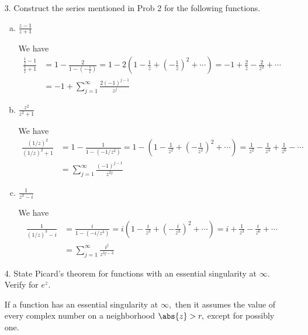 \documentclass{article}
\begin{document}
\begin{itemize}
\begin{enumerate}[(a)]
		\end{enumerate}

	\item[3.] Construct the series mentioned in Prob 2 for the following functions.
		\begin{enumerate}[(a)]
			\item $\frac{z-1}{z+1}$
				\begin{soln}
					We have
					\begin{align*}
						\frac{\frac{1}{z}-1}{\frac{1}{z}+1} &= 1-\frac{2}{1-\left( -\frac{1}{z} \right)} = 1 - 2\left( 1 - \frac{1}{z} + \left( -\frac{1}{z} \right)^2 + \cdots \right) = -1 + \frac{2}{z} - \frac{2}{z^2} + \cdots \\
						&= -1 + \sum_{j=1}^{\infty} \frac{2(-1)^{j-1}}{z^j}
					\end{align*}
				\end{soln}

			\item $\frac{z^2}{z^2+1}$
				\begin{soln}
					We have
					\begin{align*}
						\frac{(1/z)^2}{(1/z)^2+1} &= 1-\frac{1}{1-(-1/z^2)} = 1-\left( 1 - \frac{1}{z^2} + \left( -\frac{1}{z^2} \right)^2+\cdots \right)  = \frac{1}{z^2}- \frac{1}{z^4}  + \frac{1}{z^6} - \cdots \\
						&= \sum_{j=1}^{\infty} \frac{(-1)^{j-1}}{z^{2j}}
					\end{align*}
				\end{soln}

			\item $\frac{1}{z^3-i}$
				\begin{soln}
					We have
					\begin{align*}
						\frac{1}{(1/z)^3-i} &= \frac{i}{1-\left( -i/z^3 \right)} = i\left( 1 - \frac{i}{z^3} + \left( -\frac{i}{z^3} \right)^2 + \cdots \right) = i + \frac{1}{z^3} - \frac{i}{z^6} + \cdots  \\
						&= \sum_{j=1}^{\infty} \frac{i^j}{z^{3j-3}}
					\end{align*}
				\end{soln}
				
		\end{enumerate}

	\item[4.] State Picard's theorem for functions with an essential singularity at $\infty.$ Verify for $e^z.$
		\begin{soln}
			If a function has an essential singularity at $\infty,$ then it assumes the value of every complex number on a neighborhood $\abs{z}>r,$ except for possibly one.


\end{soln}
\end{itemize}
\end{document}
